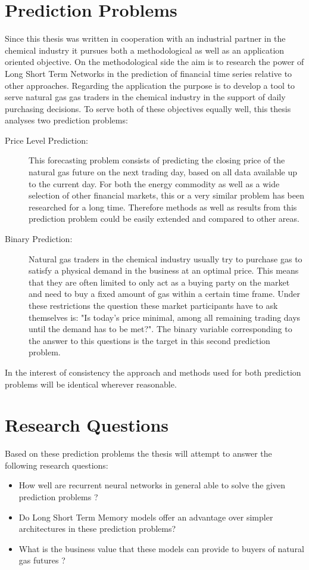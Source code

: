 \section{Prediction Problems}
Since this thesis was written in cooperation with an industrial partner in the chemical industry it pursues both a methodological as well as an application oriented objective. On the methodological side the aim is to research the power of Long Short Term Networks in the prediction of financial time series relative to other approaches. Regarding the application the purpose is to develop a tool to serve natural gas gas traders in the chemical industry in the support of daily purchasing decisions. To serve both of these objectives equally well, this thesis analyses two prediction problems:
\begin{description}
\item[Price Level Prediction:] This forecasting problem consists of predicting the closing price of the natural gas future on the next trading day, based on all data available up to the current day. For both the energy commodity as well as a wide selection of other financial markets, this or a very similar problem has been researched for a long time. Therefore methods as well as results from this prediction problem could be easily extended and compared to other areas.
\item[Binary Prediction:] Natural gas traders in the chemical industry usually try to purchase gas to satisfy a physical demand in the business at an optimal price. This means that they are often limited to only act as a buying party on the market and need to buy a fixed amount of gas within a certain time frame. Under these restrictions the question these market participants have to ask themselves is: "Is today's price minimal, among all remaining trading days until the demand has to be met?". The binary variable corresponding to the answer to this questions is the target in this second prediction problem.
\end{description}
In the interest of consistency the approach and methods used for both prediction problems will be identical wherever reasonable.
\section{Research Questions}
Based on these prediction problems the thesis will attempt to answer the following research questions:
\begin{itemize}
\item How well are recurrent neural networks in general able to solve the given prediction problems ?
\item Do Long Short Term Memory models offer an advantage over simpler architectures in these prediction problems?
\item What is the business value that these models can provide to buyers of natural gas futures ?
\end{itemize}
